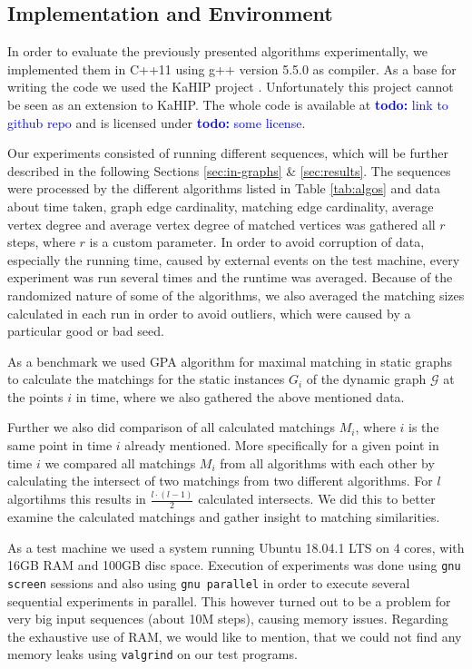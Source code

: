 \documentclass{article}      %
\newcommand\todo[1]{\textcolor{blue}{\textbf{todo: }#1}}
\begin{document}
\subsection{Implementation and Environment}
\label{sec:impl-env}

In order to evaluate the previously presented algorithms experimentally, we implemented them in C++11 using g++ version 5.5.0 as compiler. As a base for writing the code we used the KaHIP project \cite{sandersschulz2013}. Unfortunately this project cannot be seen as an extension to KaHIP. The whole code is available at \todo{link to github repo} and is licensed under \todo{some license}.

Our experiments consisted of running different sequences, which will be further described in the following Sections \ref{sec:in-graphs} \& \ref{sec:results}. The sequences were processed by the different algorithms listed in Table \ref{tab:algos} and data about time taken, graph edge cardinality, matching edge cardinality, average vertex degree and average vertex degree of matched vertices was gathered all $r$ steps, where $r$ is a custom parameter. In order to avoid corruption of data, especially the running time, caused by external events on the test machine, every experiment was run several times and the runtime was averaged. Because of the randomized nature of some of the algorithms, we also averaged the matching sizes calculated in each run in order to avoid outliers, which were caused by a particular good or bad seed.

As a benchmark we used GPA algorithm for maximal matching in static graphs to calculate the matchings for the static instances $G_i$ of the dynamic graph $\mathcal{G}$ at the points $i$ in time, where we also gathered the above mentioned data.

Further we also did comparison of all calculated matchings $M_i$, where $i$ is the same point in time $i$ already mentioned. More specifically for a given point in time $i$ we compared all matchings $M_i$ from all algorithms with each other by calculating the intersect of two matchings from two different algorithms. For $l$ algortihms this results in $\frac{l\cdot (l-1)}{2}$ calculated intersects. We did this to better examine the calculated matchings and gather insight to matching similarities.

As a test machine we used a system running Ubuntu 18.04.1 LTS on 4 cores, with 16GB RAM and 100GB disc space. Execution of experiments was done using \texttt{gnu screen} \cite{screen} sessions and also using \texttt{gnu parallel} \cite{parallel} in order to execute several sequential experiments in parallel. This however turned out to be a problem for very big input sequences (about 10M steps), causing memory issues. Regarding the exhaustive use of RAM, we would like to mention, that we could not find any memory leaks using \texttt{valgrind} \cite{valgrind} on our test programs.
\end{document}
